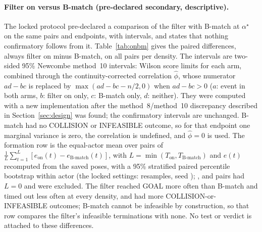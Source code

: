 \documentclass[journal]{IEEEtran}
\begin{document}
\paragraph{Filter on versus B-match (pre-declared secondary, descriptive).} The locked protocol
pre-declared a comparison of the filter with B-match at $\alpha^\star$ on the same pairs and
endpoints, with intervals, and states that nothing confirmatory follows from it.
Table~\ref{tab:onbm} gives the paired differences, always filter on minus B-match, on all
\PairsPerDensity{} pairs per density. The intervals are two-sided 95\% Newcombe method~10
intervals: Wilson score limits for each arm, combined through the continuity-corrected correlation
$\hat\phi$, whose numerator $ad-bc$ is replaced by $\max(ad-bc-n/2,0)$ when $ad-bc>0$ ($a$: event
in both arms, $b$: filter on only, $c$: B-match only, $d$: neither). They were computed with a new
implementation after the method~8/method~10 discrepancy described in Section~\ref{sec:design} was
found; the confirmatory intervals are unchanged.
B-match had no COLLISION or INFEASIBLE outcome, so for that endpoint one marginal variance is zero,
the correlation is undefined, and $\hat\phi=0$ is used. The formation row is the equal-actor mean
over pairs of $\frac{1}{L}\sum_{t=1}^{L}[e_{\text{on}}(t)-e_{\text{B-match}}(t)]$, with
$L=\min(T_{\text{on}},T_{\text{B-match}})$ and $e(t)$ recomputed from the saved poses, with a 95\%
stratified paired percentile bootstrap within actor (the locked settings: \BootReps{} resamples,
seed \BootSeed); \OnBmFormExclone, \OnBmFormExcltwo{} and \OnBmFormExclthree{} pairs had $L=0$
and were excluded. The filter reached GOAL more often than B-match and timed out less often at every
density, and had more COLLISION-or-INFEASIBLE outcomes; B-match cannot be infeasible by construction,
so that row compares the filter's infeasible terminations with none. No test or verdict is
attached to these differences.
\end{document}
